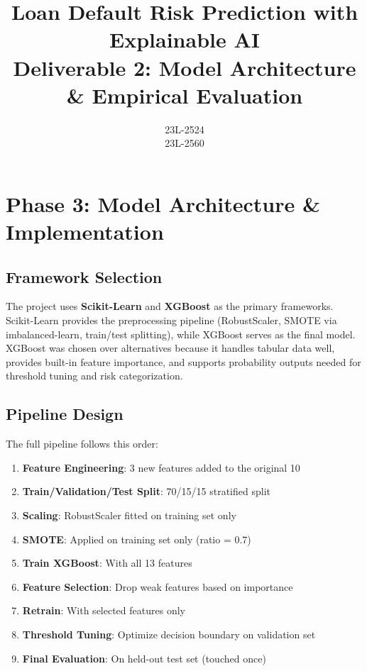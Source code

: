 \documentclass[12pt, a4paper]{article}
\title{\textbf{Loan Default Risk Prediction with Explainable AI} \\ \large Deliverable 2: Model Architecture \& Empirical Evaluation}
\author{23L-2524 \\ 23L-2560}
\date{\vspace{-2em}}
\begin{document}
\maketitle
\tableofcontents
\newpage


\section{Phase 3: Model Architecture \& Implementation}

\subsection{Framework Selection}

The project uses \textbf{Scikit-Learn} and \textbf{XGBoost} as the primary frameworks. Scikit-Learn provides the preprocessing pipeline (RobustScaler, SMOTE via imbalanced-learn, train/test splitting), while XGBoost serves as the final model. XGBoost was chosen over alternatives because it handles tabular data well, provides built-in feature importance, and supports probability outputs needed for threshold tuning and risk categorization.

\subsection{Pipeline Design}

The full pipeline follows this order:

\begin{enumerate}[noitemsep]
    \item \textbf{Feature Engineering}: 3 new features added to the original 10
    \item \textbf{Train/Validation/Test Split}: 70/15/15 stratified split
    \item \textbf{Scaling}: RobustScaler fitted on training set only
    \item \textbf{SMOTE}: Applied on training set only (ratio = 0.7)
    \item \textbf{Train XGBoost}: With all 13 features
    \item \textbf{Feature Selection}: Drop weak features based on importance
    \item \textbf{Retrain}: With selected features only
    \item \textbf{Threshold Tuning}: Optimize decision boundary on validation set
    \item \textbf{Final Evaluation}: On held-out test set (touched once)
\end{enumerate}
\end{document}
